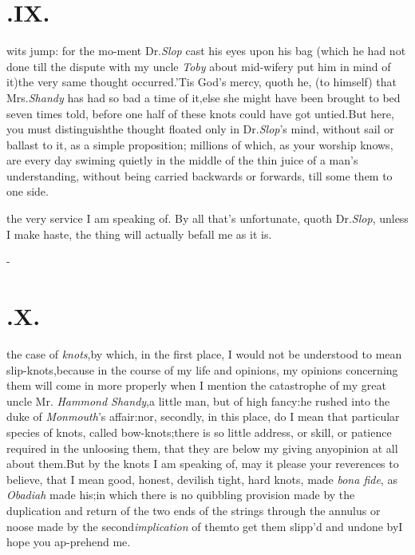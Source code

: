 \documentclass{article}
\begin{document}
\section{.\quad  IX.}

 wits jump: for the mo-\break ment Dr.\@ \textit{Slop} cast his eyes upon\break
his bag (which he
had not done till the dispute with my uncle \textit{Toby} about mid-wifery put him
in mind of it)\tsk the very same thought occurred.\tsh ’Tis God’s mercy, quoth he, (to
himself) that Mrs.\@ \textit{Shandy} has had so bad a time of it,\tsh else she might
have been brought to bed seven times told, before one half of these knots could have
got untied.\tsh But here, you must distinguish\tsh the\break
thought floated only in Dr.\@ \textit{Slop}’s mind,\break
without sail or ballast to it, as a simple proposition;
millions of which, as your worship knows, are every day swiming quietly in the
middle of the thin juice of a man’s understanding, without being carried backwards
or forwards, till some\break
{} them to one side.

  the very service I am speaking of. By
all that’s unfortunate, quoth Dr.\@ \textit{Slop}, unless I make
haste, the thing will actually befall me as it is.

\vfill{}\eject

\null\kern-\baselineskip
\section{.\quad  X.}

 the case of \textit{knots},\tsh by which, in\break
the first place, I would not be under\-stood to mean slip-knots,\tsk because in the course of my life and
opinions,\tsh\break
my opinions concerning them will come in more properly when I mention the
catastrophe of my great uncle Mr.  \textit{Hammond Shandy},\tsk a little man,\tsk
but of\break
high fancy:\tsk he rushed into the duke of \textit{Monmouth}’s affair:\tsh nor,
secondly, in this place, do I mean that particular species of knots, called
bow-knots;\tsk there is so little address, or skill, or patience required in the
unloosing them, that they are below my giving any\break opinion at all about them.\tsk But
by the knots I am speaking of, may it please your reverences to believe, that I
mean
good, honest, devilish tight, hard knots, made \textit{bona fide}, as
\textit{Obadiah} made his;\tsh in which there is no quibbling provision made by the
duplication and return of the two ends of the strings through the annulus or noose
made by the second\break\textit{implication} of them\tsk to get them slipp’d and
undone by\tsh\tsh I hope you ap-\break prehend me.
\end{document}
